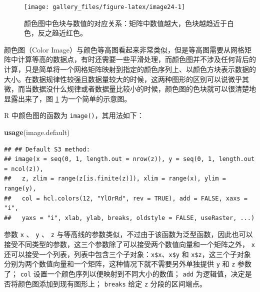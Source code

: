\documentclass[
  b5paper,
  UTF8,twoside]{book}
\newenvironment{Shaded}{\begin{snugshade}}{\end{snugshade}}
\newcommand{\FunctionTok}[1]{\textcolor[rgb]{0.13,0.29,0.53}{\textbf{#1}}}
\newcommand{\NormalTok}[1]{#1}
\begin{document}
\begin{figure}

{\centering \texttt{[image: gallery\_files/figure-latex/image24-1]} 

}

\caption[颜色图中色块与数值的对应关系]{颜色图中色块与数值的对应关系：矩阵中数值越大，色块越趋近于白色，反之趋近红色。}\label{fig:image24}
\end{figure}

颜色图（Color Image）与颜色等高图看起来非常类似，但是等高图需要从网格矩阵中计算等高的数据点，有时还需要一些平滑处理，而颜色图并不涉及任何背后的计算，只是简单将一个网格矩阵映射到指定的颜色序列上、以颜色方块表示数据的大小。在数据规律性较强且数据量较大的时候，这两种图形的区别可以说微乎其微，而当数据没什么规律或者数据量比较小的时候，颜色图的色块就可以很清楚地显露出来了，图 \ref{fig:image24}
为一个简单的示意图。

R 中颜色图的函数为 \texttt{image()}，其用法如下：

\begin{Shaded}
\begin{Highlighting}[]
\FunctionTok{usage}\NormalTok{(image.default)}
\end{Highlighting}
\end{Shaded}

\begin{verbatim}
## ## Default S3 method:
## image(x = seq(0, 1, length.out = nrow(z)), y = seq(0, 1, length.out = ncol(z)),
##   z, zlim = range(z[is.finite(z)]), xlim = range(x), ylim = range(y),
##   col = hcl.colors(12, "YlOrRd", rev = TRUE), add = FALSE, xaxs = "i",
##   yaxs = "i", xlab, ylab, breaks, oldstyle = FALSE, useRaster, ...)
\end{verbatim}

参数 \texttt{x} 、 \texttt{y} 、 \texttt{z} 与等高线的参数类似，不过由于该函数为泛型函数，因此也可以接受不同类型的参数，这三个参数除了可以接受两个数值向量和一个矩阵之外， \texttt{x} 还可以接受一个列表，列表中包含三个子对象：\texttt{x\$x}、\texttt{x\$y} 和 \texttt{x\$z}，这三个子对象分别为两个数值向量和一个矩阵，这种情况下就不需要另外单独提供 \texttt{y} 和 \texttt{z} 参数了； \texttt{col} 设置一个颜色序列以便映射到不同大小的数值； \texttt{add} 为逻辑值，决定是否将颜色图添加到现有图形上； \texttt{breaks} 给定 \texttt{z} 分段的区间端点。
\end{document}
